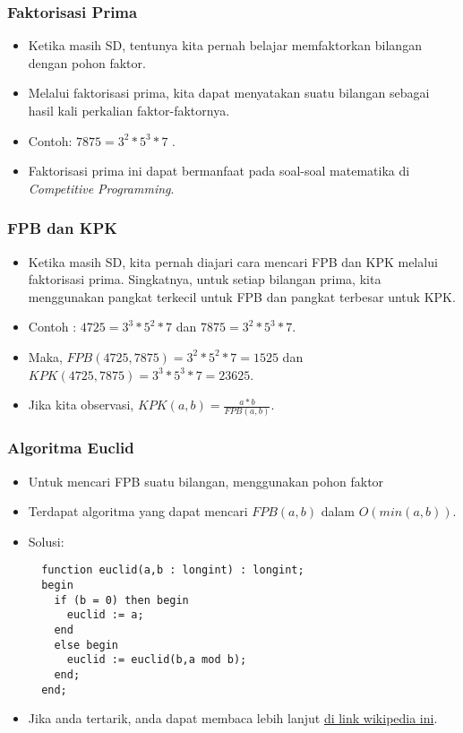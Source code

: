 \begin{frame}
\frametitle{Faktorisasi Prima}
\begin{itemize}
  \item Ketika masih SD, tentunya kita pernah belajar memfaktorkan bilangan dengan pohon faktor.
  \item Melalui faktorisasi prima, kita dapat menyatakan suatu bilangan sebagai hasil kali perkalian faktor-faktornya.
  \item Contoh: $7875 = 3^{2} * 5^{3} * 7$ .
  \item Faktorisasi prima ini dapat bermanfaat pada soal-soal matematika di \textit{Competitive Programming}.
\end{itemize}
\end{frame}

\begin{frame}
\frametitle{FPB dan KPK}
\begin{itemize}
  \item Ketika masih SD, kita pernah diajari cara mencari FPB dan KPK melalui faktorisasi prima. Singkatnya, untuk setiap bilangan prima, kita menggunakan pangkat terkecil untuk FPB dan pangkat terbesar untuk KPK.
  \item Contoh : $4725 = 3^{3} * 5^{2} * 7$ dan $7875 = 3^{2} * 5^{3} * 7$.
  \item Maka, $FPB(4725,7875) = 3^{2} * 5^{2} * 7 = 1525$ dan $KPK(4725,7875) = 3^{3} * 5^{3} * 7 = 23625$.
  \item Jika kita observasi, $KPK(a,b) = \frac{a * b}{FPB(a,b)}$. 
\end{itemize}
\end{frame}

\begin{frame}[fragile]
\frametitle{Algoritma Euclid}
\begin{itemize}
  \item Untuk mencari FPB suatu bilangan, menggunakan pohon faktor 
  \item Terdapat algoritma yang dapat mencari $FPB(a,b)$ dalam $O(min(a,b))$.
  \item Solusi:
  \begin{lstlisting}
  function euclid(a,b : longint) : longint;
  begin
    if (b = 0) then begin
      euclid := a;
    end
    else begin
      euclid := euclid(b,a mod b);
    end;
  end;
  \end{lstlisting}
  \item Jika anda tertarik, anda dapat membaca lebih lanjut \textcolor{blue}{\href{https://en.wikipedia.org/wiki/Euclidean_algorithm}{di link wikipedia ini}.}   
\end{itemize}
\end{frame}

